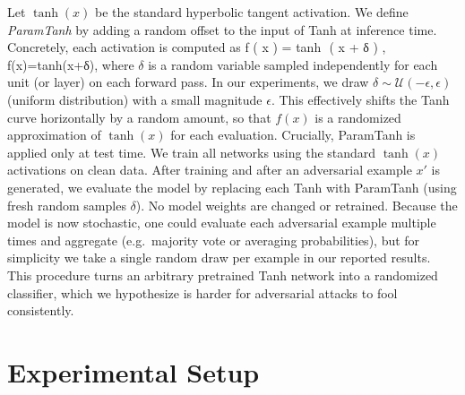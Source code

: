\documentclass{llncs}
\begin{document}
Let $\tanh(x)$ be the standard hyperbolic tangent activation. We define \emph{ParamTanh} by adding a random offset to the input of Tanh at inference time. Concretely, each activation is computed as
f
(
x
)
=
tanh
⁡
(
x
+
δ
)
,
f(x)=tanh(x+δ),
where $\delta$ is a random variable sampled independently for each unit (or layer) on each forward pass. In our experiments, we draw $\delta \sim \mathcal{U}(-\epsilon,\epsilon)$ (uniform distribution) with a small magnitude $\epsilon$. This effectively shifts the Tanh curve horizontally by a random amount, so that $f(x)$ is a randomized approximation of $\tanh(x)$ for each evaluation. Crucially, ParamTanh is applied only at test time. We train all networks using the standard $\tanh(x)$ activations on clean data. After training and after an adversarial example $x'$ is generated, we evaluate the model by replacing each Tanh with ParamTanh (using fresh random samples $\delta$). No model weights are changed or retrained. Because the model is now stochastic, one could evaluate each adversarial example multiple times and aggregate (e.g.\ majority vote or averaging probabilities), but for simplicity we take a single random draw per example in our reported results. This procedure turns an arbitrary pretrained Tanh network into a randomized classifier, which we hypothesize is harder for adversarial attacks to fool consistently. \section{Experimental Setup}
\end{document}
